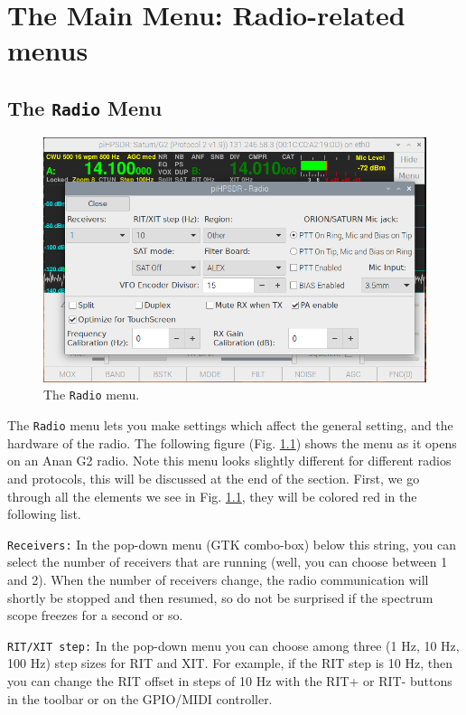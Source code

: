 \documentclass[12pt]{book}
\def\rett#1{\texttt{\color{red}#1}}
\def\bltt#1{\texttt{\color{blue}#1}}
\begin{document}
\chapter{The Main Menu: Radio-related menus}
\section{The \texttt{Radio} Menu}

\begin{figure}[ht]
\center
\includegraphics[width=12cm]{RadioMenu.png}
\caption{The \bltt{Radio} menu.}
\label{fig:RadioMenu}
\end{figure}


The \bltt{Radio} menu lets you make settings which affect the general setting, and the hardware of the
radio.
The following figure (Fig. \ref{fig:RadioMenu}) shows the menu as it opens on an Anan G2 radio.
Note this menu looks slightly different for different radios and protocols, this will be discussed
at the end of the section. First, we go through all the elements we see in Fig. \ref{fig:RadioMenu},
they will be colored red in the following list.

\rett{Receivers:} In the pop-down menu (GTK combo-box) below this string, you can select the number
of receivers that are running (well, you can choose between 1 and 2). When the number of receivers change,
the radio communication will shortly be stopped and then resumed, so do not be surprised if the spectrum
scope freezes for a second or so.

\rett{RIT/XIT step:} In the pop-down menu you can choose among three (1 Hz, 10 Hz, 100 Hz) step sizes
for RIT and XIT. For example, if the RIT step is 10 Hz, then you can change the RIT offset in steps of
10 Hz with the RIT+ or RIT- buttons in the toolbar or on the GPIO/MIDI controller.
\end{document}
